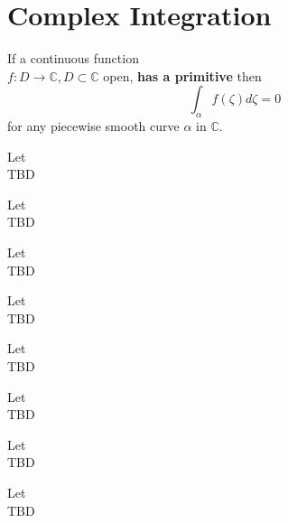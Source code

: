 \section{Complex Integration}


\begin{theorem}
    \label{sec:ClosedContourT}
    If a continuous function \\ $f : D \rightarrow \mathbb{C} , D \subset \mathbb{C}$ open, \textbf{has a primitive} then
    $$\int_\alpha f(\zeta)d\zeta = 0$$
    for any piecewise smooth curve $\alpha$ in $\mathbb{C}$.
\end{theorem}


\begin{theorem}
    \label{sec:MainTCalculus}
    Let \\
    TBD
\end{theorem}


\begin{theorem}
    \label{sec:CauchyITT}
    Let \\
    TBD
\end{theorem}


\begin{theorem}
    \label{sec:CauchyITR}
    Let \\
    TBD
\end{theorem}


\begin{theorem}
    \label{sec:CauchyIF}
    Let \\
    TBD
\end{theorem}


\begin{theorem}
    \label{sec:GCauchyIF}
    Let \\
    TBD
\end{theorem}


\begin{theorem}
    \label{sec:MoreraT}
    Let \\
    TBD
\end{theorem}


\begin{theorem}
    \label{sec:LiouvilleT}
    Let \\
    TBD
\end{theorem}


\begin{theorem}
    \label{sec:FTAlgebra}
    Let \\
    TBD
\end{theorem}